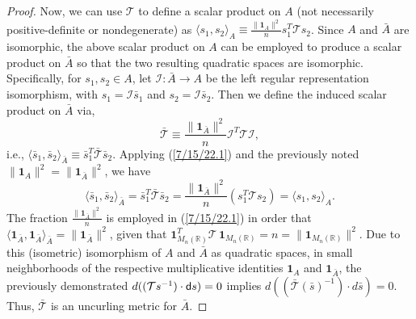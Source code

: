 \documentclass{amsart}
\numberwithin{equation}{section}
\theoremstyle{definition}
\numberwithin{theorem}{section}
\begin{document}
\begin{proof}
   Now, we can use $\mathcal{\mathcal{T}}$ to define a scalar product on $A$ (not necessarily positive-definite or nondegenerate) as $\langle s_1,s_2\rangle_A \equiv  \frac{\|\mathbf{1}_{A}\|^2}{n}s_1^T \mathcal{\mathcal{T}} s_2$. 
    Since $A$ and $\bar{A}$ are isomorphic, the above scalar product on $A$ can be employed to produce a scalar product on $\bar{A}$ so that the two resulting quadratic spaces are isomorphic.  Specifically,  for $s_1,s_2\in A$, let $ \mathcal{I}:\bar{A}\rightarrow A$ be the left regular representation isomorphism, with $s_1 = \mathcal{I}\bar{s}_1$ and $s_2= \mathcal{I}\bar{s}_2 $.  Then we define the induced scalar product on $\bar{A}$ via, \begin{equation}\label{7/15/22.1} \bar{\mathcal{\mathcal{T}}} \equiv  \frac{\|\mathbf{1}_{\bar{A}}\|^2}{n}\mathcal{I}^T\mathcal{\mathcal{T}}\mathcal{I},\end{equation} i.e., $\langle \bar{s}_1,\bar{s}_2\rangle_{\bar{A}} \equiv \bar{s}_1^T \bar{\mathcal{\mathcal{T}}} \bar{s}_2$.  Applying (\ref{7/15/22.1}) and the previously noted $\|\mathbf{1}_A\|^2 = \|\mathbf{1}_{\bar{A}}\|^2$, we have \begin{equation}\label{8/25/22.1} \langle \bar{s}_1,\bar{s}_2\rangle_{\bar{A}} = \bar{s}_1^T \bar{\mathcal{T}} \bar{s}_2 = \frac{\|\mathbf{1}_{\bar{A}}\|^2}{n}( s_1^T \mathcal{T} s_2) = \langle s_1,s_2\rangle_{A}.\end{equation}  The fraction $\frac{\|\mathbf{1}_{\bar{A}}\|^2}{n}$ is employed in (\ref{7/15/22.1}) in order that $\langle \mathbf{1}_{\bar{A}},\mathbf{1}_{\bar{A}}\rangle_{\bar{A}} = \|\mathbf{1}_{\bar{A}}\|^2$, given that $\mathbf{1}_{M_n(\mathbb{R})}^T \mathcal{T}\,\mathbf{1}_{M_n(\mathbb{R})} = n = \|\mathbf{1}_{M_n(\mathbb{R})}\|^2$. Due to this (isometric) isomorphism of $A$ and $\bar{A}$ as quadratic spaces,  in small neighborhoods of the respective multiplicative identities $\mathbf{1}_A$ and $\mathbf{1}_{\bar{A}}$, the previously demonstrated $d((\mathcal{T}s^{-1})\cdot {\sf d}s) = 0$ implies 
\mbox{$d((\bar{\mathcal{T}}(\bar{s})^{-1})\cdot d\bar{s}) = 0$.} Thus, $\bar{\mathcal{T}}$ is an uncurling metric for $\bar{A}$.



\end{proof}
\end{document}
